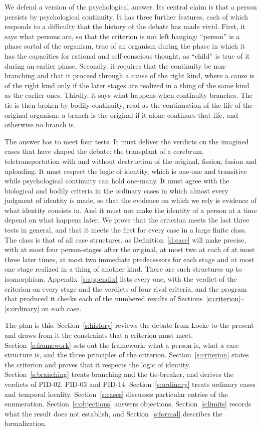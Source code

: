 \documentclass{situationist-preprint}
\begin{document}
We defend a version of the psychological answer. Its central claim is that a person persists by psychological continuity. It has three further features, each of which responds to a difficulty that the history of the debate has made vivid. First, it says what persons are, so that the criterion is not left hanging: \enquote{person} is a phase sortal of the organism, true of an organism during the phase in which it has the capacities for rational and self-conscious thought, as \enquote{child} is true of it during an earlier phase. Secondly, it requires that the continuity be non-branching and that it proceed through a cause of the right kind, where a cause is of the right kind only if the later stages are realized in a thing of the same kind as the earlier ones. Thirdly, it says what happens when continuity branches. The tie is then broken by bodily continuity, read as the continuation of the life of the original organism: a branch is the original if it alone continues that life, and otherwise no branch is.

The answer has to meet four tests. It must deliver the verdicts on the imagined cases that have shaped the debate: the transplant of a cerebrum, teletransportation with and without destruction of the original, fission, fusion and uploading. It must respect the logic of identity, which is one-one and transitive while psychological continuity can hold one-many. It must agree with the biological and bodily criteria in the ordinary cases in which almost every judgment of identity is made, so that the evidence on which we rely is evidence of what identity consists in. And it must not make the identity of a person at a time depend on what happens later. We prove that the criterion meets the last three tests in general, and that it meets the first for every case in a large finite class. The class is that of all case structures, as Definition~\ref{d:case} will make precise, with at most four person-stages after the original, at most two at each of at most three later times, at most two immediate predecessors for each stage and at most one stage realized in a thing of another kind. There are \stcases{} such structures up to isomorphism. Appendix~\ref{s:appendix} lists every one, with the verdict of the criterion on every stage and the verdicts of four rival criteria, and the program that produced it checks each of the numbered results of Sections~\ref{s:criterion}--\ref{s:ordinary} on each case.

The plan is this. Section~\ref{s:history} reviews the debate from Locke to the present and draws from it the constraints that a criterion must meet. Section~\ref{s:framework} sets out the framework: what a person is, what a case structure is, and the three principles of the criterion. Section~\ref{s:criterion} states the criterion and proves that it respects the logic of identity. Section~\ref{s:branching} treats branching and the tie-breaker, and derives the verdicts of PID-02, PID-03 and PID-14. Section~\ref{s:ordinary} treats ordinary cases and temporal locality. Section~\ref{s:cases} discusses particular entries of the enumeration. Section~\ref{s:objections} answers objections, Section~\ref{s:limits} records what the result does not establish, and Section~\ref{s:formal} describes the formalization.
\end{document}
